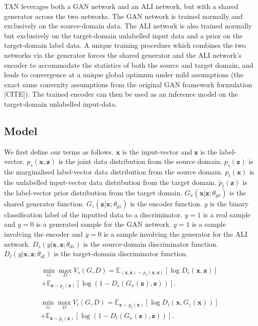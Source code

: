 \documentclass{article}
\begin{document}
TAN leverages both a GAN network and an ALI network, but with a shared generator across the two networks. The GAN network is trained normally and exclusively on the source-domain data. The ALI network is also trained normally but exclusively on the target-domain unlabelled input data and a prior on the target-domain label data. A unique training procedure which combines the two networks via the generator forces the shared generator and the ALI network's encoder to accommodate the statistics of both the source and target domain, and leads to convergence at a unique global optimum under mild assumptions (the exact same convexity assumptions from the original GAN framework formulation [CITE]). The trained encoder can then be used as an inference model on the target-domain unlabelled input-data.
\subsection{Model}
We first define our terms as follows. $\bm{x}$ is the input-vector and $\bm{z}$ is the label-vector. $p_s(\bm{x},\bm{z})$ is the joint data distribution from the source domain. $p_s(\bm{z})$ is the marginalised label-vector data distribution from the source domain. $p_t(\bm{x})$ is the unlabelled input-vector data distribution from the target domain. $\widetilde{p}_t(\bm{z})$ is the label-vector prior distribution from the target domain. $G_x(\bm{x}|\bm{z}; \theta_{gx})$ is the shared generator function. $G_z(\bm{z}|\bm{x}; \theta_{gz})$ is the encoder function. $y$ is the binary classification label of the inputted data to a discriminator. $y=1$ is a real sample and $y=0$ is a generated sample for the GAN network. $y=1$ is a sample involving the encoder and $y=0$ is a sample involving the generator for the ALI network. $D_s(y|\bm{x},\bm{z}; \theta_{ds})$ is the source-domain discriminator function. $D_t(y|\bm{x},\bm{z}; \theta_{dt})$ is the target-domain discriminator function.

\begin{equation}
\begin{split}
\min_{G} \max_{D} V_s(G, D) = \mathbb{E}_{(\bm{x},\bm{z})\sim p_s(\bm{x},\bm{z})}[\log D_s(\bm{x}, \bm{z})]\\
+ \mathbb{E}_{\bm{z}\sim p_{s}(\bm{z})}[\log (1 - D_s(G_x(\bm{z}), \bm{z}) )].
\end{split}
\end{equation}

\begin{equation}
\begin{split}
\min_{G} \max_{D} V_t(G, D) = \mathbb{E}_{\bm{x}\sim p_{t}(\bm{x})}[\log D_t(\bm{x}, G_z(\bm{x}))]\\
+  \mathbb{E}_{\bm{z}\sim \widetilde{p}_{t}(\bm{z})}[\log (1 - D_t(G_x(\bm{z}), \bm{z}))].
\end{split}
\end{equation}
\end{document}
